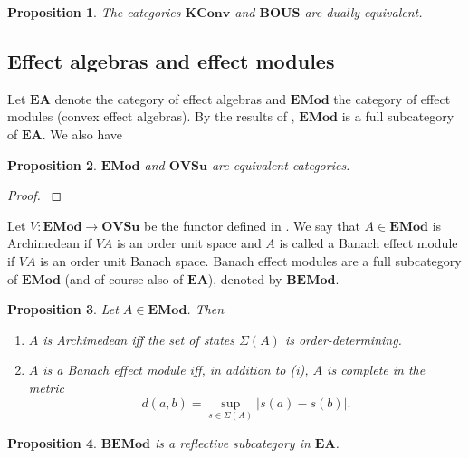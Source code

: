 \documentclass[12pt]{article}
\newtheorem{prop}{Proposition}
\newcommand{\<}{\langle}
\newcommand{\ct}[1]{\mathbf{#1}}
\begin{document}
\begin{prop}\cite{} The categories $\ct{KConv}$ and $\ct{BOUS}$ are dually equivalent.

\end{prop}








\subsection{Effect algebras and effect modules}

Let $\ct{EA}$ denote the category of effect algebras and $\ct{EMod}$ the category of effect modules (convex effect algebras). By the results of \cite{sylvia_plus3}, 
$\ct{EMod}$ is a full subcategory of $\ct{EA}$. We also have

\begin{prop}\label{prop:EMod_OVSu}   $\ct{EMod}$ and $\ct{OVSu}$ are equivalent categories.

\end{prop}

\begin{proof} \cite{sylvia_plus3} 

\end{proof}

Let $V: \ct{EMod}\to \ct{OVSu}$ be the functor defined in \cite{sylvia_plus3}. We say that $A\in \ct{EMod}$ is Archimedean if $VA$ is an order unit space and $A$ is called 
a Banach effect module  if $VA$ is an  order unit Banach space. Banach effect modules are a full subcategory of $\ct{EMod}$ (and of course also of $\ct{EA}$), denoted by 
$\ct{BEMod}$.

\begin{prop} Let $A\in \ct{EMod}$. Then 
\begin{enumerate}
\item[(i)] $A$ is Archimedean iff the set of states $\Sigma(A)$ is order-determining.
\item[(ii)]\cite{roroy} $A$ is a Banach effect module iff, in addition to (i), $A$ is complete in the metric
\[
d(a,b)=\sup_{s\in \Sigma(A)} |s(a)-s(b)|.
\] 
\end{enumerate}


\end{prop}

\begin{prop} $\ct{BEMod}$ is a reflective subcategory in $\ct{EA}$.


\end{prop}
\end{document}

